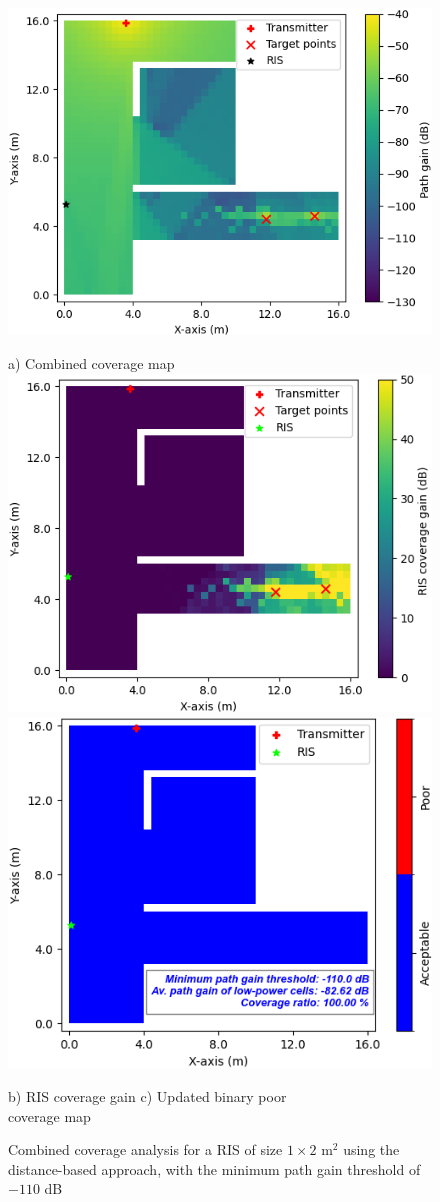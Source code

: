 \documentclass{IEEEoj}
\begin{document}
\begin{figure}
	\centering
	\includegraphics[width=0.8\linewidth]{Sim_Results/Comb_cov_1x2_Distance_-110dB.png}
	
	a) Combined coverage map \\[5pt]
	
	\includegraphics[width=0.49\linewidth]{Sim_Results/RIS_cov_gain_1x2_Distance_-110dB.png}
	\hfill
	\includegraphics[width=0.48\linewidth]{Sim_Results/New_Binary_Cov_Map_1x2_Distance_-110dB.png}
	
	\hspace{10pt} b) RIS coverage gain \hspace{30pt} c) Updated binary poor \\ \hspace{140pt} coverage map
	\caption{Combined coverage analysis for a RIS of size $1 \times 2$ m$^2$ using the distance-based approach, with the minimum path gain threshold of $-110$ dB}
	\label{comb_cov_distance_-110dB}
\end{figure}
\end{document}

